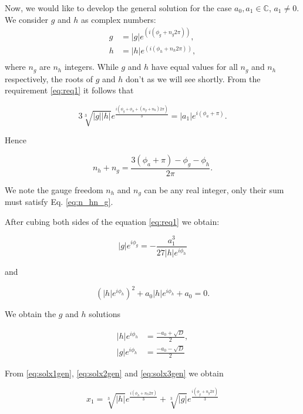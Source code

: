 \documentclass{article}
\begin{document}
Now, we would like to develop the general solution for the case $a_0, a_1 \in \mathbb{C}$, $a_1\neq0$. We consider $g$ and $h$ as complex numbers:
\begin{align}
  g&=|g|e^{\left(i\left(\phi_g+n_g2\pi\right)\right)},\\
  h&=|h|e^{\left(i\left(\phi_h+n_h2\pi\right)\right)},\\
\end{align}
where $n_g$ are $n_h$ integers. While $g$ and $h$ have equal values for all $n_g$ and $n_h$ respectively, the roots of $g$ and $h$ don't as we will see shortly. From the requirement \eqref{eq:req1} it follows that

\begin{equation}
  3\sqrt[3]{|g||h|}e^\frac{i\left(\phi_g+\phi_h+\left(n_g+n_h\right)2\pi\right)}{3}=|a_1|e^{i\left(\phi_a+\pi\right)}.
\end{equation}

Hence

\begin{equation}
  n_h+n_g=\frac{3\left(\phi_a+\pi\right)-\phi_g-\phi_h}{2\pi}
  \label{eq:n_hn_g}.
\end{equation}

We note the gauge freedom \textendash $n_h$ and $n_g$ can be any real integer, only their sum must satisfy Eq. \eqref{eq:n_hn_g}.

After cubing both sides of the equation \eqref{eq:req1} we obtain:

\begin{equation}
  |g|e^{i\phi_g}=-\frac{a_1^{3}}{27|h|e^{i\phi_h}}
\end{equation}

and

\begin{equation}
  \left(|h|e^{i\phi_h}\right)^2+a_0|h|e^{i\phi_h}+a_0=0.
\end{equation}

We obtain the $g$ and $h$ solutions

\begin{align}
  |h|e^{i\phi_h}&=\frac{-a_0+\sqrt{D}}{2},\\
  |g|e^{i\phi_h}&=\frac{-a_0-\sqrt{D}}{2}
\end{align}

From \eqref{eq:solx1gen}, \eqref{eq:solx2gen} and \eqref{eq:solx3gen} we obtain

\begin{equation}
  x_1=\sqrt[3]{|h|}e^{\frac{i\left(\phi_h+n_h2\pi\right)}{3}}+\sqrt[3]{|g|}e^{\frac{i\left(\phi_g+n_g2\pi\right)}{3}}
\end{equation}
\end{document}
